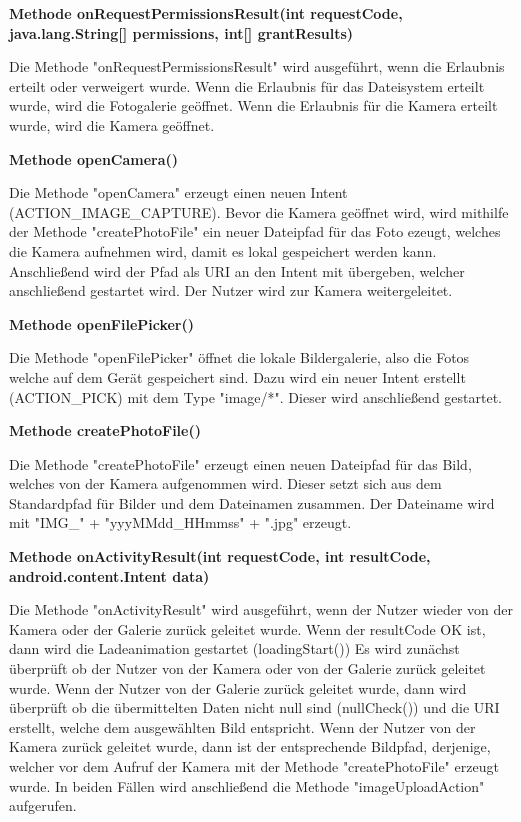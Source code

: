 \documentclass{scrartcl}
\begin{document}
\noindent\textbf{Methode onRequestPermissionsResult(int requestCode, \newline java.lang.String[] permissions, int[] grantResults)} 

\noindent Die Methode "onRequestPermissionsResult" wird ausgeführt, wenn die Erlaubnis erteilt oder verweigert wurde. Wenn die Erlaubnis für das Dateisystem erteilt wurde, wird die Fotogalerie geöffnet. Wenn die Erlaubnis für die Kamera erteilt wurde, wird die Kamera geöffnet. \newline 

\noindent\textbf{Methode openCamera()} 

\noindent Die Methode "openCamera" erzeugt einen neuen Intent (ACTION\_IMAGE\_CAPTURE). Bevor die Kamera geöffnet wird, wird mithilfe der Methode "createPhotoFile" ein neuer Dateipfad für das Foto ezeugt, welches die Kamera aufnehmen wird, damit es lokal gespeichert werden kann. Anschließend wird der Pfad als URI an den Intent mit übergeben, welcher anschließend gestartet wird. Der Nutzer wird zur Kamera weitergeleitet. \newline 

\noindent\textbf{Methode openFilePicker()} 

\noindent Die Methode "openFilePicker" öffnet die lokale Bildergalerie, also die Fotos welche auf dem Gerät gespeichert sind. Dazu wird ein neuer Intent erstellt (ACTION\_PICK) mit dem Type "image/*". Dieser wird anschließend gestartet. \newline 

\noindent\textbf{Methode createPhotoFile()} 

\noindent Die Methode "createPhotoFile" erzeugt einen neuen Dateipfad für das Bild, welches von der Kamera aufgenommen wird. Dieser setzt sich aus dem Standardpfad für Bilder und dem Dateinamen zusammen. Der Dateiname wird mit "IMG\_" + "yyyMMdd\_HHmmss" + ".jpg" erzeugt. \newline 

\noindent\textbf{Methode onActivityResult(int requestCode, \newline int resultCode, android.content.Intent data)} 

\noindent Die Methode "onActivityResult" wird ausgeführt, wenn der Nutzer wieder von der Kamera oder der Galerie zurück geleitet wurde. Wenn der resultCode OK ist, dann wird die Ladeanimation gestartet (loadingStart()) Es wird zunächst überprüft ob der Nutzer von der Kamera oder von der Galerie zurück geleitet wurde. Wenn der Nutzer von der Galerie zurück geleitet wurde, dann wird überprüft ob die übermittelten Daten nicht null sind (nullCheck()) und die URI erstellt, welche dem ausgewählten Bild entspricht. Wenn der Nutzer von der Kamera zurück geleitet wurde, dann ist der entsprechende Bildpfad, derjenige, welcher vor dem Aufruf der Kamera mit der Methode "createPhotoFile" erzeugt wurde. In beiden Fällen wird anschließend die Methode "imageUploadAction" aufgerufen. \newline 
\end{document}
